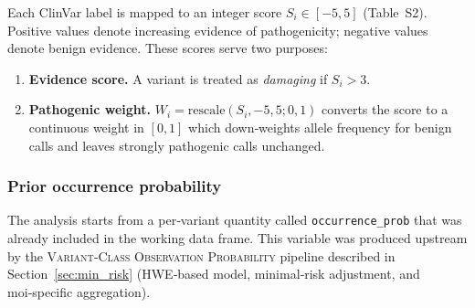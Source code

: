 Each ClinVar label is mapped to an integer score
$S_i\in[-5,5]$ (Table~S2).  Positive values denote increasing evidence of
pathogenicity; negative values denote benign evidence.
These scores serve two purposes:

\begin{enumerate}
  \item \textbf{Evidence score.}  A variant is treated as
        \textit{damaging} if $S_i>3$.
  \item \textbf{Pathogenic weight.}
        $W_i=\text{rescale}(S_i,-5,5;0,1)$ converts the score
        to a continuous weight in $[0,1]$ which down‑weights allele
        frequency for benign calls and leaves strongly pathogenic calls
        unchanged.
\end{enumerate}

%



\subsubsection{Prior occurrence probability}

The analysis starts from a per‑variant quantity called
\verb|occurrence_prob| that was already included in the working
data frame.  This variable was produced upstream by the
\textsc{Variant‑Class Observation Probability} pipeline described in
Section~\ref{sec:min_risk} (HWE‑based model, minimal‐risk adjustment,
and \ac{moi}‑specific aggregation).%

